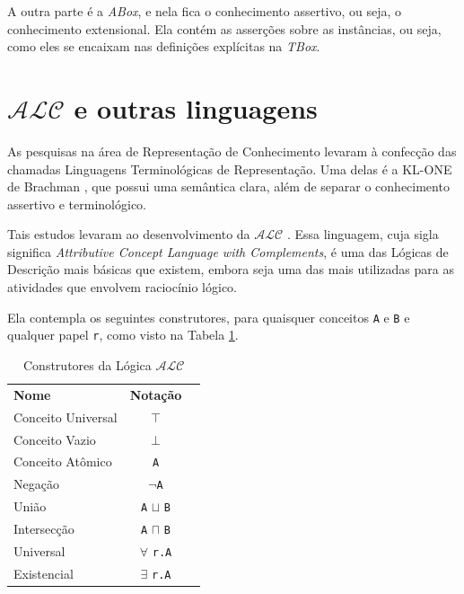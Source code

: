 A outra parte é a \textit{ABox}, e nela fica o conhecimento assertivo, ou seja, o conhecimento extensional. Ela contém as asserções sobre as instâncias, ou seja, como eles se encaixam nas definições explícitas na \textit{TBox}.

\section{$\mathcal{ALC}$ e outras linguagens}

As pesquisas na área de Representação de Conhecimento levaram à confecção das chamadas Linguagens Terminológicas de Representação. Uma delas é a KL-ONE de Brachman \cite{logicaBrachman}, que possui uma semântica clara, além de separar o conhecimento assertivo e terminológico.

Tais estudos levaram ao desenvolvimento da $\mathcal{ALC}$ \cite{logicaSchmidt}. Essa linguagem, cuja sigla significa \textit{Attributive Concept Language with Complements}, é uma das Lógicas de Descrição mais básicas que existem, embora seja uma das mais utilizadas para as atividades que envolvem raciocínio lógico. 

Ela contempla os seguintes construtores, para quaisquer conceitos \texttt{A} e \texttt{B} e qualquer papel \texttt{r}, como visto na Tabela \ref{tab:alc}.

\begin{table}[H]
	\centering
	\begin{tabular}{|l|c|l}
		\cline{1-2}
		\textbf{Nome}               & \textbf{Notação}                          &  \\ \cline{1-2}
		Conceito Universal & $ \top $                         &  \\ \cline{1-2}
		Conceito Vazio     & $ \bot $                         &  \\ \cline{1-2}
		Conceito Atômico   & \texttt{A}                       &  \\ \cline{1-2}
		Negação            & $ \neg $\texttt{A}               &  \\ \cline{1-2}
		União              & \texttt{A} $ \sqcup $ \texttt{B} &  \\ \cline{1-2}
		Intersecção        & \texttt{A} $ \sqcap $ \texttt{B} &  \\ \cline{1-2}
		Universal          & $\forall$ \texttt{r.A}           &  \\ \cline{1-2}
		Existencial        & $\exists$ \texttt{r.A}           &  \\ \cline{1-2}
	\end{tabular}
	\caption{Construtores da Lógica $ \mathcal{ALC} $}
	\label{tab:alc}
\end{table}

